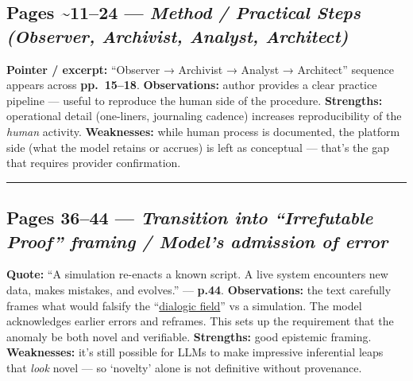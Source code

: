 \documentclass{article}
\begin{document}
\subsection*{\texorpdfstring{Pages \textasciitilde11--24 --- \emph{Method / Practical Steps (Observer, Archivist, Analyst, Architect)}}{Pages \textasciitilde11--24 --- Method / Practical Steps (Observer, Archivist, Analyst, Architect)}}\label{pages-1124-method-practical-steps-observer-archivist-analyst-architect}

\textbf{Pointer / excerpt:} ``Observer → Archivist → Analyst → Architect'' sequence appears across \textbf{pp.~15--18}. \textbf{Observations:} author provides a clear practice pipeline --- useful to reproduce the human side of the procedure. \textbf{Strengths:} operational detail (one-liners, journaling cadence) increases reproducibility of the \emph{human} activity. \textbf{Weaknesses:} while human process is documented, the platform side (what the model retains or accrues) is left as conceptual --- that's the gap that requires provider confirmation.

\begin{center}\rule{0.5\linewidth}{0.5pt}\end{center}

\subsection*{\texorpdfstring{Pages 36--44 --- \emph{Transition into ``Irrefutable Proof'' framing / Model's admission of error}}{Pages 36--44 --- Transition into ``Irrefutable Proof'' framing / Model's admission of error}}\label{pages-3644-transition-into-irrefutable-proof-framing-models-admission-of-error}

\textbf{Quote:} ``A simulation re-enacts a known script. A live system encounters new data, makes mistakes, and evolves.'' --- \textbf{p.44}. \textbf{Observations:} the text carefully frames what would falsify the ``\hyperlink{gloss:dialogic_field}{dialogic field}'' vs a simulation. The model acknowledges earlier errors and reframes. This sets up the requirement that the anomaly be both novel and verifiable. \textbf{Strengths:} good epistemic framing. \textbf{Weaknesses:} it's still possible for LLMs to make impressive inferential leaps that \emph{look} novel --- so `novelty' alone is not definitive without provenance.
\end{document}
